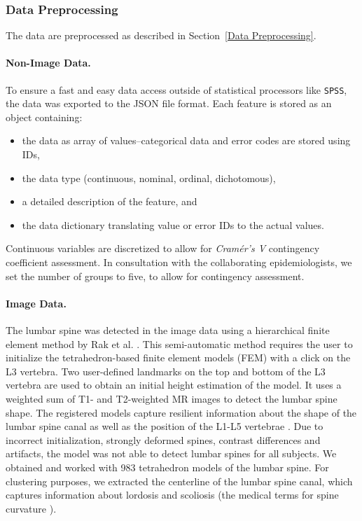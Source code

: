 \documentclass[journal]{style/vgtc} 			          %
\begin{document}
\subsubsection{Data Preprocessing} \label{application:Data Preprocessing}
The data are preprocessed as described in Section~\ref{Data Preprocessing}.
%
\paragraph{Non-Image Data.} 

To ensure a fast and easy data access outside of statistical processors like \texttt{SPSS}, the data was exported to the JSON file format.
%
Each feature is stored as an object containing: 
\begin{itemize}
	\item the data as array of values--categorical data and error codes are stored using IDs,
	\item the data type (continuous, nominal, ordinal, dichotomous),
	\item a detailed description of the feature, and
	\item the data dictionary translating value or error IDs to the actual values.
\end{itemize}
%
Continuous variables are discretized to allow for \emph{Cram\'{e}r's V} contingency coefficient assessment.
%
In consultation with the collaborating epidemiologists, we set the number of groups to five, to allow for contingency assessment.

\paragraph{Image Data.} \label{Image-Data}
The lumbar spine was detected in the image data using a hierarchical finite element method by Rak et al. \cite{Rak2013}.
%
This semi-automatic method requires the user to initialize the tetrahedron-based finite element models (FEM) with a click on the L3 vertebra.
%
Two user-defined landmarks on the top and bottom of the L3 vertebra are used to obtain an initial height estimation of the model.
%
It uses a weighted sum of T1- and T2-weighted MR images to detect the lumbar spine shape.
%
The registered models capture resilient information about the shape of the lumbar spine canal as well as the position of the L1-L5 vertebrae \cite{Klemm2013VMV}.
%
Due to incorrect initialization, strongly deformed spines, contrast differences and artifacts, the model was not able to detect lumbar spines for all subjects.
%
We obtained and worked with 983 tetrahedron models of the lumbar spine.
%
For clustering purposes, we extracted the centerline of the lumbar spine canal, which captures information about lordosis and scoliosis (the medical terms for spine curvature \cite{Klemm2013VMV}).
\end{document}
